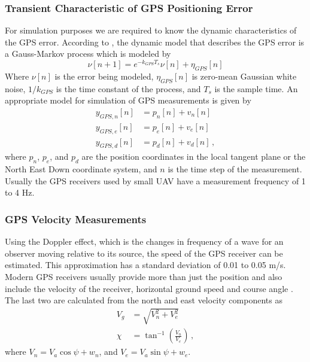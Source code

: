 \subsubsection{Transient Characteristic of GPS Positioning Error}
For simulation purposes we are required to know the dynamic characteristics of the GPS error. According to \cite{Rankin1994}, the dynamic model that describes the GPS error is a Gauss-Markov process which is modeled by
\begin{equation}
\nu[n+1]=e^{-k_{GPS}T_s}\nu[n]+\eta_{GPS}[n]
\end{equation}
Where \begin{math} \nu[n] \end{math} is the error being modeled, \begin{math} \eta_{GPS}[n] \end{math} is zero-mean Gaussian white noise, \begin{math} 1/k_{GPS} \end{math} is the time constant of the process, and \begin{math} T_s \end{math} is the sample time. An appropriate model for simulation of GPS measurements is given by
\begin{align}
y_{GPS,n}[n]&=p_n[n]+v_n[n]\\
y_{GPS,e}[n]&=p_e[n]+v_e[n]\\
y_{GPS,d}[n]&=p_d[n]+v_d[n]\,,
\end{align}
where \begin{math}p_n\end{math}, \begin{math}p_e\end{math}, and \begin{math} p_d\end{math} are the position coordinates in the local tangent plane or the North East Down coordinate system, and \begin{math} n \end{math} is the time step of the measurement. Usually the GPS receivers used by small UAV have a measurement frequency of 1 to 4 Hz.

\subsubsection{GPS Velocity Measurements}
Using the Doppler effect, which is the changes in frequency of a wave for an observer moving relative to its source, the speed of the GPS receiver can be estimated. This approximation has a standard deviation of 0.01 to 0.05 m/s. Modern GPS receivers usually provide more than just the position and also include the velocity of the receiver, horizontal ground speed and course angle \cite{Beard2010}.
The last two are calculated from the north and east velocity components as
\begin{align}
V_g&=\sqrt{V_n^2+V_e^2} \label{eq:Vg}\\
\chi&=\tan^{-1}\left(\frac{V_n}{V_e}\right)\,,\label{eq:chi}
\end{align}
where $ V_n=V_a\cos\psi+w_n $, and $ V_e=V_a\sin\psi+w_e $. 

